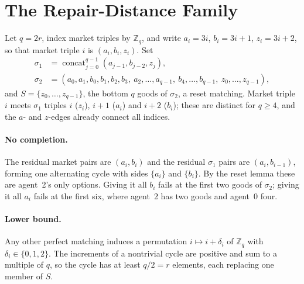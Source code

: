\documentclass[11pt]{article}
\theoremstyle{definition}
\begin{document}
\section{The Repair-Distance Family}\label{app:distance}
Let $q=2r$, index market triples by $\mathbb Z_q$, and write $a_i=3i$, $b_i=3i+1$, $z_i=3i+2$, so that market triple $i$ is $(a_i,b_i,z_i)$. Set
\begin{align*}
\sigma_1&=\mathop{\mathrm{concat}}_{j=0}^{q-1}(a_{j-1},b_{j-2},z_j),\\
\sigma_2&=(a_0,a_1,b_0,b_1,b_2,b_3,\ a_2,\dots,a_{q-1},\ b_4,\dots,b_{q-1},\ z_0,\dots,z_{q-1}),
\end{align*}
and $S=\{z_0,\dots,z_{q-1}\}$, the bottom $q$ goods of $\sigma_2$, a reset matching. Market triple $i$ meets $\sigma_1$ triples $i$ ($z_i$), $i+1$ ($a_i$) and $i+2$ ($b_i$); these are distinct for $q\ge4$, and the $a$- and $z$-edges already connect all indices.

\paragraph{No completion.}
The residual market pairs are $(a_i,b_i)$ and the residual $\sigma_1$ pairs are $(a_i,b_{i-1})$, forming one alternating cycle with sides $\{a_i\}$ and $\{b_i\}$. By the reset lemma these are agent~2's only options. Giving it all $b_i$ fails at the first two goods of $\sigma_2$; giving it all $a_i$ fails at the first six, where agent~2 has two goods and agent~0 four.

\paragraph{Lower bound.}
Any other perfect matching induces a permutation $i\mapsto i+\delta_i$ of $\mathbb Z_q$ with $\delta_i\in\{0,1,2\}$. The increments of a nontrivial cycle are positive and sum to a multiple of $q$, so the cycle has at least $q/2=r$ elements, each replacing one member of $S$.
\end{document}
